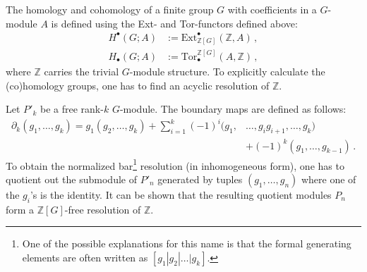 	The homology and cohomology of a finite group $G$ with coefficients in a $G$-module $A$ is defined using the Ext- and Tor-functors defined above:
	\begin{align}
		H^\bullet(G;A) &:= \mathrm{Ext}_{\mathbb{Z}[G]}^\bullet(\mathbb{Z},A)\,,\\
		H_\bullet(G;A) &:= \mathrm{Tor}^{\mathbb{Z}[G]}_\bullet(A,\mathbb{Z})\,,
	\end{align}
	where $\mathbb{Z}$ carries the trivial $G$-module structure. To explicitly calculate the (co)homology groups, one has to find an acyclic resolution of $\mathbb{Z}$.
	\begin{construct}
		Let $P'_k$ be a free rank-$k$ $G$-module. The boundary maps are defined as follows:
		\begin{align}
			\label{homalg:group_boundary}
			\partial_k(g_1,\ldots,g_k) = g_1(g_2,\ldots,g_k) + \sum_{i=1}^k (-1)^i(g_1,&\ldots,g_ig_{i+1},\ldots,g_k)\\
             &+ (-1)^k(g_1,\ldots,g_{k-1})\,.\nonumber
		\end{align}
		To obtain the normalized bar\footnote{One of the possible explanations for this name is that the formal generating elements are often written as $[g_1|g_2|\ldots|g_k]$.} resolution (in inhomogeneous form), one has to quotient out the submodule of $P'_n$ generated by tuples $(g_1,\ldots,g_n)$ where one of the $g_i$'s is the identity. It can be shown that the resulting quotient modules $P_n$ form a $\mathbb{Z}[G]$-free resolution of $\mathbb{Z}$.
	\end{construct}

